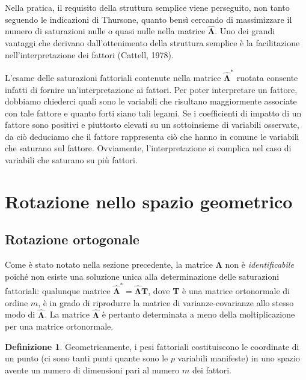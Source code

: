 \documentclass[
  11pt,
]{krantz}
\theoremstyle{definition}
\newtheorem{definition}{Definizione}[chapter]
\theoremstyle{definition}
\theoremstyle{definition}
\theoremstyle{definition}
\theoremstyle{remark}
\begin{document}
Nella pratica, il requisito della struttura semplice viene perseguito, non tanto seguendo le indicazioni di Thursone, quanto bensì cercando di massimizzare il numero di saturazioni nulle o quasi nulle nella matrice \(\hat{\boldsymbol{\Lambda}}\). Uno dei grandi vantaggi che derivano dall'ottenimento della struttura semplice è la facilitazione nell'interpretazione dei fattori (Cattell, 1978).

L'esame delle saturazioni fattoriali contenute nella matrice \(\hat{\boldsymbol{\Lambda}}^*\) ruotata consente infatti di fornire un'interpretazione ai fattori. Per poter interpretare un fattore, dobbiamo chiederci quali sono le variabili che risultano maggiormente associate con tale fattore e quanto forti siano tali legami. Se i coefficienti di impatto di un fattore sono positivi e piuttosto elevati su un sottoinsieme di variabili osservate, da ciò deduciamo che il fattore rappresenta ciò che hanno in comune le variabili che saturano sul fattore. Ovviamente, l'interpretazione si complica nel caso di variabili che saturano su più fattori.

\hypertarget{rotazione-nello-spazio-geometrico}{%
\section{Rotazione nello spazio geometrico}\label{rotazione-nello-spazio-geometrico}}

\hypertarget{rotazione-ortogonale}{%
\subsection{Rotazione ortogonale}\label{rotazione-ortogonale}}

Come è stato notato nella sezione precedente, la matrice \(\boldsymbol{\Lambda}\) non è \emph{identificabile} poiché non esiste una soluzione unica alla determinazione delle saturazioni fattoriali: qualunque matrice \(\hat{\boldsymbol{\Lambda}}^* = \hat{\boldsymbol{\Lambda}} \textbf{T}\), dove \textbf{T} è una matrice ortonormale di ordine \(m\), è in grado di riprodurre la matrice di varianze-covarianze allo stesso modo di \(\hat{\boldsymbol{\Lambda}}\). La matrice \(\hat{\boldsymbol{\Lambda}}\) è pertanto determinata a meno della moltiplicazione per una matrice ortonormale.

\begin{definition}
Geometricamente, i pesi fattoriali costituiscono le coordinate di un punto (ci sono tanti punti quante sono le \(p\) variabili manifeste) in uno spazio avente un numero di dimensioni pari al numero \(m\) dei fattori.
\end{definition}
\end{document}

